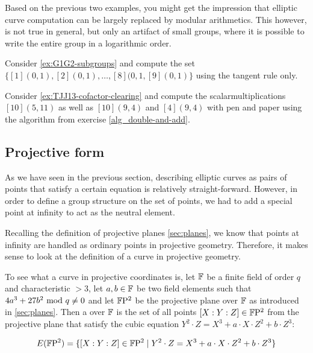 Based on the previous two examples, you  might get the impression that elliptic curve computation can be largely replaced by modular arithmetics. This however, is not true in general, but only an artifact of small groups, where it is possible to write the entire group in a logarithmic order.
\begin{exercise} Consider \examplename{} \ref{ex:G1G2-subgroups} and compute the set 
$\{[1](0,1), [2](0,1),\ldots,[8](0,1,[9](0,1)\}$ using the tangent rule only.
\end{exercise}
\begin{exercise} Consider \examplename{} \ref{ex:TJJ13-cofactor-clearing} and compute the scalarmultiplications $[10](5,11)$ as well as $[10](9,4)$ and $[4](9,4)$ with pen and paper using the algorithm from exercise \ref{alg_double-and-add}.
\end{exercise}
\subsection{Projective  form}
As we have seen in the previous section, describing elliptic curves as pairs of points that satisfy a certain equation is relatively straight-forward. However, in order to define a group structure on the set of points, we had to add a special point at infinity to act as the neutral element. 

Recalling the definition of projective planes \ref{sec:planes}, we know that points at infinity are handled as ordinary points in projective geometry. Therefore, it makes  sense to look at the definition of a  curve in projective geometry.

To see what a  curve in projective coordinates is, let $\mathbb{F}$ be a finite field of order $q$ and characteristic $>3$, let $a,b\in \mathbb{F}$ be two field elements such that $4a^3+ 27b^2 \text{ mod } q\neq 0$ and let $\mathbb{F}\mathrm{P}^2$ be the projective plane over $\mathbb{F}$ as introduced in \secname{} \ref{sec:planes}. Then a  over $\mathbb{F}$ is the set of all points $[X:Y:Z]\in \mathbb{F}\mathrm{P}^2$ from the projective plane that satisfy the cubic equation $Y^2\cdot Z = X^3+a\cdot X\cdot Z^2 + b\cdot Z^3$:

\begin{equation}
\label{def:projective_cubic_equation}
E(\mathbb{F}\mathrm{P}^2) = \{[X:Y:Z]\in \mathbb{F}\mathrm{P}^2\;|\; Y^2\cdot Z = X^3+a\cdot X\cdot Z^2 + b\cdot Z^3 \}
\end{equation}

